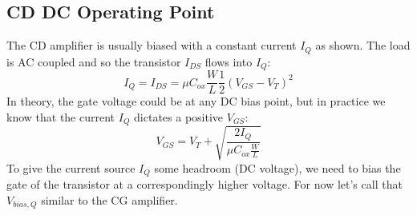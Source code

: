 \subsection{CD DC Operating Point}
The CD amplifier is usually biased with a constant current $I_Q$ as shown.  The load is AC coupled and so the transistor $I_{DS}$ flows into $I_Q$:
\begin{equation}
	I_Q = {I_{DS}} = \mu {C_{ox}}\frac{W}{L}\frac{1}{2}{({V_{GS}} - {V_T})^2}	
\end{equation}
In theory, the gate voltage could be at any DC bias point, but in practice we know that the current $I_Q$ dictates a positive $V_{GS}$:
\begin{equation}
	{V_{GS}} = {V_T} + \sqrt {\frac{{2{I_{Q}}}}{{\mu {C_{ox}}\frac{W}{L}}}} 
\end{equation}
To give the current source $I_Q$ some headroom (DC voltage), we need to bias the gate of the transistor at a correspondingly higher voltage.  For now let's call that $V_{bias,Q}$ similar to the CG amplifier.
